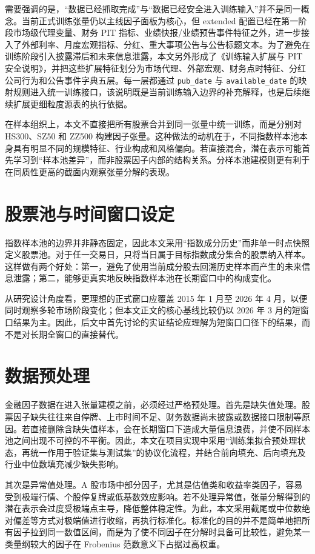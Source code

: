 需要强调的是，“数据已经抓取完成”与“数据已经安全进入训练输入”并不是同一概念。当前正式训练张量仍以主线因子面板为核心，但 extended 配置已经在第一阶段市场级代理变量、财务 PIT 指标、业绩快报/业绩预告事件特征之外，进一步接入了外部利率、月度宏观指标、分红、重大事项公告与公告标题文本。为了避免在训练阶段引入披露滞后和未来信息泄露，本文另外形成了《训练输入扩展与 PIT 安全说明》，并把这些扩展特征划分为市场代理、外部宏观、财务点时特征、分红公司行为和公告事件字典五层。每一层都通过 \texttt{pub\_date} 与 \texttt{available\_date} 的映射规则进入统一训练接口，该说明既是当前训练输入边界的补充解释，也是后续继续扩展更细粒度源表的执行依据。

在样本组织上，本文不直接把所有股票合并到同一张量中统一训练，而是分别对 HS300、SZ50 和 ZZ500 构建因子张量。这种做法的动机在于，不同指数样本池本身具有明显不同的规模特征、行业构成和风格偏向。若直接混合，潜在表示可能首先学习到“样本池差异”，而非股票因子内部的结构关系。分样本池建模则更有利于在同质性更高的截面内观察张量分解的表现。

\section{股票池与时间窗口设定}

指数样本池的边界并非静态固定，因此本文采用“指数成分历史”而非单一时点快照定义股票池。对于任一交易日，只将当日属于目标指数成分集合的股票纳入样本。这样做有两个好处：第一，避免了使用当前成分股去回溯历史样本而产生的未来信息泄露；第二，能够更真实地反映指数样本池在长期窗口中的构成变化。

从研究设计角度看，更理想的正式窗口应覆盖 2015 年 1 月至 2026 年 4 月，以便同时观察多轮市场阶段变化；但本文正文的核心基线比较仍以 2026 年 3 月的短窗口结果为主。因此，后文中首先讨论的实证结论应理解为短窗口口径下的结果，而不是对长期全窗口的直接替代。

\section{数据预处理}

金融因子数据在进入张量建模之前，必须经过严格预处理。首先是缺失值处理。股票因子缺失往往来自停牌、上市时间不足、财务数据尚未披露或数据接口限制等原因。若直接删除含缺失值样本，会在长期窗口下造成大量信息浪费，并使不同样本池之间出现不可控的不平衡。因此，本文在项目实现中采用“训练集拟合预处理状态，再统一作用于验证集与测试集”的协议化流程，并结合前向填充、后向填充及行业中位数填充减少缺失影响。

其次是异常值处理。A 股市场中部分因子，尤其是估值类和收益率类因子，容易受到极端行情、个股停复牌或低基数效应影响。若不处理异常值，张量分解得到的潜在表示会过度受极端点主导，降低整体稳定性。为此，本文采用截尾或中位数绝对偏差等方式对极端值进行收缩，再执行标准化。标准化的目的并不是简单地把所有因子拉到同一数值区间，而是为了使不同因子在分解时具备可比较性，避免某一类量纲较大的因子在 Frobenius 范数意义下占据过高权重。

